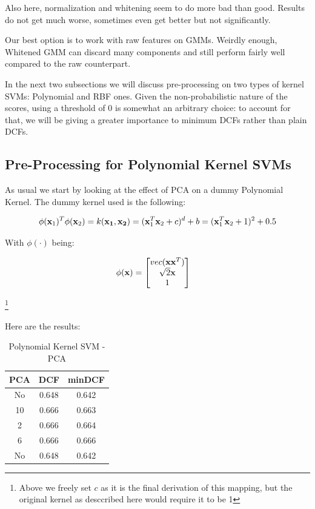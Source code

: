 \documentclass[twocolumn]{article}
\begin{document}
Also here, normalization and whitening seem to do more bad than good. Results do not get much worse, sometimes even get better but not significantly.

Our best option is to work with raw features on GMMs. Weirdly enough, Whitened GMM can discard many components and still perform fairly well compared to the raw counterpart.


In the next two subsections we will discuss pre-processing on two types of kernel SVMs: Polynomial and RBF ones. 
Given the non-probabilistic nature of the scores, using a threshold of $0$ is somewhat an arbitrary choice: to account for that, we will be giving a greater importance to minimum DCFs rather than plain DCFs.

\subsection{Pre-Processing for Polynomial Kernel SVMs}

As usual we start by looking at the effect of PCA on a dummy Polynomial Kernel. The dummy kernel used is the following:

$$ \phi({\bf x}_1)^T\phi({\bf x}_2) = k({\bf x_1}, {\bf x_2}) = ({\bf x}_1^T{\bf x}_2 + c)^d + b = ({\bf x}_1^T{\bf x}_2+1)^2+0.5$$

With $\phi(\cdot)$ being:

\begin{center}
    \begin{align}
        \phi({\bf x}) & = \begin{bmatrix}
                            vec({\bf x}{\bf x}^T) \\
                            \sqrt{2}{\bf x} \\
                            1 \\
                      \end{bmatrix}
    \end{align}
\end{center}
\footnote{Above we freely set $c$ as it is the final derivation of this mapping, but the original kernel as desccribed here would require it to be 1}

Here are the results:

\begin{table}[H]
    \centering
        \begin{tabular}{||c|c|c||}
            \hline
            PCA & DCF & minDCF \\
            \hline
            \hline
                No & 0.648 & 0.642 \\ 
                10 & 0.666 & 0.663 \\ 
                2  & 0.666 & 0.664 \\ 
                6  & 0.666 & 0.666 \\ 
            \hline
            No & 0.648 & 0.642 \\ 
            \hline
    \end{tabular}
    \caption{Polynomial Kernel SVM - PCA}
\end{table}
\end{document}
